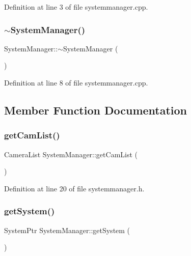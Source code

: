 Definition at line 3 of file systemmanager.\+cpp.

\mbox{\label{class_system_manager_a0fa2e3c0906401494f6bf4e482aecc0d}} 
\subsubsection{\texorpdfstring{$\sim$SystemManager()}{~SystemManager()}}
{\footnotesize\ttfamily System\+Manager\+::$\sim$\+System\+Manager (\begin{DoxyParamCaption}{ }\end{DoxyParamCaption})}



Definition at line 8 of file systemmanager.\+cpp.



\subsection{Member Function Documentation}
\mbox{\label{class_system_manager_af00f9094762037857e2b76b4b2781ec2}} 
\subsubsection{\texorpdfstring{getCamList()}{getCamList()}}
{\footnotesize\ttfamily Camera\+List System\+Manager\+::get\+Cam\+List (\begin{DoxyParamCaption}{ }\end{DoxyParamCaption})\hspace{0.3cm}{\ttfamily [inline]}}



Definition at line 20 of file systemmanager.\+h.

\mbox{\label{class_system_manager_a8299a2453dcf4a6b4e398528ccef6859}} 
\subsubsection{\texorpdfstring{getSystem()}{getSystem()}}
{\footnotesize\ttfamily System\+Ptr System\+Manager\+::get\+System (\begin{DoxyParamCaption}{ }\end{DoxyParamCaption})\hspace{0.3cm}{\ttfamily [inline]}}



